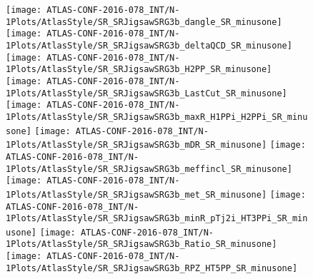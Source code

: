 \begin{figure}[tbph]
\begin{center}
\texttt{[image: ATLAS-CONF-2016-078\_INT/N-1Plots/AtlasStyle/SR\_SRJigsawSRG3b\_dangle\_SR\_minusone]}
\texttt{[image: ATLAS-CONF-2016-078\_INT/N-1Plots/AtlasStyle/SR\_SRJigsawSRG3b\_deltaQCD\_SR\_minusone]}
\texttt{[image: ATLAS-CONF-2016-078\_INT/N-1Plots/AtlasStyle/SR\_SRJigsawSRG3b\_H2PP\_SR\_minusone]}
\texttt{[image: ATLAS-CONF-2016-078\_INT/N-1Plots/AtlasStyle/SR\_SRJigsawSRG3b\_LastCut\_SR\_minusone]}
\texttt{[image: ATLAS-CONF-2016-078\_INT/N-1Plots/AtlasStyle/SR\_SRJigsawSRG3b\_maxR\_H1PPi\_H2PPi\_SR\_minusone]}
\texttt{[image: ATLAS-CONF-2016-078\_INT/N-1Plots/AtlasStyle/SR\_SRJigsawSRG3b\_mDR\_SR\_minusone]}
\texttt{[image: ATLAS-CONF-2016-078\_INT/N-1Plots/AtlasStyle/SR\_SRJigsawSRG3b\_meffincl\_SR\_minusone]}
\texttt{[image: ATLAS-CONF-2016-078\_INT/N-1Plots/AtlasStyle/SR\_SRJigsawSRG3b\_met\_SR\_minusone]}
\texttt{[image: ATLAS-CONF-2016-078\_INT/N-1Plots/AtlasStyle/SR\_SRJigsawSRG3b\_minR\_pTj2i\_HT3PPi\_SR\_minusone]}
\texttt{[image: ATLAS-CONF-2016-078\_INT/N-1Plots/AtlasStyle/SR\_SRJigsawSRG3b\_Ratio\_SR\_minusone]}
\texttt{[image: ATLAS-CONF-2016-078\_INT/N-1Plots/AtlasStyle/SR\_SRJigsawSRG3b\_RPZ\_HT5PP\_SR\_minusone]}
\end{center}
\caption{}
\label{fig:SR_SRJigsawSRG3a_minR_pTj2i_HT3PPi_SR_minusone}
\end{figure}

\begin{figure}[tbph]
\begin{center}
\end{center}
\caption{}
\label{fig:SR_SRJigsawSRG3b_LastCut_SR_minusone}
\end{figure}


